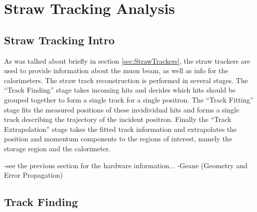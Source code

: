 \thispagestyle{myheadings} %

\graphicspath{ {Body/Figures/TrackingFigures/} {Body/Figures/TrackingFigures/MainPlots/} {Body/Figures/TrackingFigures/MainPlots/PlanePlots/} {Body/Figures/TrackingFigures/MainPlots/PullPlots/} {Body/Figures/TrackingFigures/MainPlots/Residuals/} {Body/Figures/TrackingFigures/eLoss/} {Body/Figures/TrackingFigures/CoordSys/} {Body/Figures/TrackingFigures/TrackerPics/} {Body/Figures/TrackingFigures/Field/} {Body/Figures/TrackingFigures/TrackingFlow/} {Body/Figures/TrackingFigures/LeftRight/} {Body/Figures/TrackingFigures/Misc/} {Body/Figures/TrackingFigures/Extrapolation/} {Body/Figures/TrackingFigures/Tracks/} }

\chapter{Straw Tracking Analysis}
\label{chapter:Straw Tracking Analysis}

\section{Straw Tracking Intro}
\label{sec:StrawTrackingIntro}

As was talked about briefly in section \ref{sec:StrawTrackers}, the straw trackers are used to provide information about the muon beam, as well as info for the calorimeters. The straw track reconstruction is performed in several stages. The ``Track Finding'' stage takes incoming hits and decides which hits should be grouped together to form a single track for a single positron. The ``Track Fitting'' stage fits the measured positions of these invidividual hits and forms a single track describing the trajectory of the incident positron. Finally the ``Track Extrapolation'' stage takes the fitted track information and extrapolates the position and momentum components to the regions of interest, namely the storage region and the calorimeter.







-see the previous section for the hardware information...
-Geane (Geometry and Error Propagation)




\section{Track Finding}
\label{sec:Track Finding}


